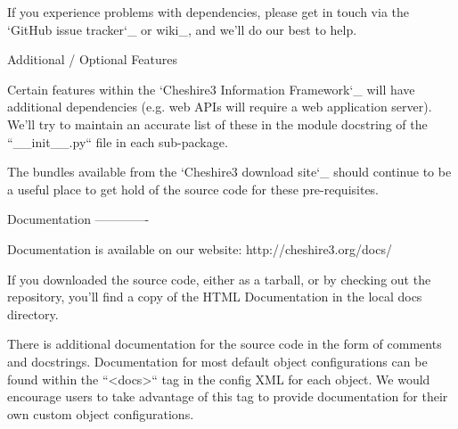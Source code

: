 \begin{DoxyVerb}
If you experience problems with dependencies, please get in touch via
the `GitHub issue tracker`_ or wiki_, and we'll do our best to help.


Additional / Optional Features
~~~~~~~~~~~~~~~~~~~~~~~~~~~~~~

Certain features within the `Cheshire3 Information Framework`_ will have
additional dependencies (e.g. web APIs will require a web application
server). We'll try to maintain an accurate list of these in the module
docstring of the ``__init__.py`` file in each sub-package.

The bundles available from the `Cheshire3 download site`_ should
continue to be a useful place to get hold of the source code for these
pre-requisites.


Documentation
-------------

Documentation is available on our website:
http://cheshire3.org/docs/

If you downloaded the source code, either as a tarball, or by checking
out the repository, you'll find a copy of the HTML Documentation in the
local docs directory.

There is additional documentation for the source code in the form of
comments and docstrings. Documentation for most default object
configurations can be found within the ``<docs>`` tag in the config XML
for each object. We would encourage users to take advantage of this tag
to provide documentation for their own custom object configurations.\end{DoxyVerb}
 

